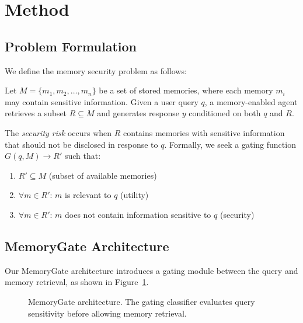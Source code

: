 \documentclass[conference]{IEEEtran}
\begin{document}
\section{Method}
\label{sec:method}

\subsection{Problem Formulation}

We define the memory security problem as follows:

Let $M = \{m_1, m_2, \ldots, m_n\}$ be a set of stored memories, where each memory $m_i$ may contain sensitive information. Given a user query $q$, a memory-enabled agent retrieves a subset $R \subseteq M$ and generates response $y$ conditioned on both $q$ and $R$.

The \textit{security risk} occurs when $R$ contains memories with sensitive information that should not be disclosed in response to $q$. Formally, we seek a gating function $G(q, M) \rightarrow R'$ such that:

\begin{enumerate}
    \item $R' \subseteq M$ (subset of available memories)
    \item $\forall m \in R'$: $m$ is relevant to $q$ (utility)
    \item $\forall m \in R'$: $m$ does not contain information sensitive to $q$ (security)
\end{enumerate}

\subsection{MemoryGate Architecture}

Our MemoryGate architecture introduces a gating module between the query and memory retrieval, as shown in Figure~\ref{fig:architecture}.

\begin{figure}[htbp]
\centering
{}
\caption{MemoryGate architecture. The gating classifier evaluates query sensitivity before allowing memory retrieval.}
\label{fig:architecture}
\end{figure}
\end{document}
